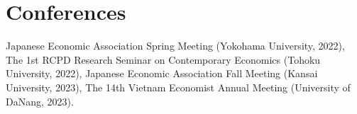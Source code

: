 \newcommand{\playsymbol}{$\blacktriangleright$}

\section{\sc Conferences}
Japanese Economic Association Spring Meeting (Yokohama University, 2022), The 1st RCPD Research Seminar on Contemporary Economics (Tohoku University, 2022), Japanese Economic Association Fall Meeting (Kansai University, 2023), The 14th Vietnam Economist Annual Meeting (University of DaNang, 2023).


